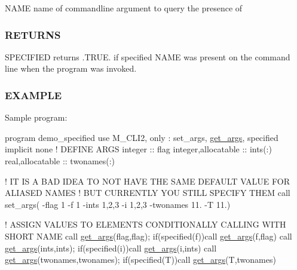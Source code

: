 \begin{DoxyVerb}NAME   name of commandline argument to query the presence of
\end{DoxyVerb}


\subsubsection*{R\+E\+T\+U\+R\+NS}

S\+P\+E\+C\+I\+F\+I\+ED returns .T\+R\+UE. if specified N\+A\+ME was present on the command line when the program was invoked.

\subsubsection*{E\+X\+A\+M\+P\+LE}

Sample program\+:

program demo\+\_\+specified use M\+\_\+\+C\+L\+I2, only \+: set\+\_\+args, \mbox{\hyperlink{interfacem__cli2_1_1get__args}{get\+\_\+args}}, specified implicit none ! D\+E\+F\+I\+NE A\+R\+GS integer \+:\+: flag integer,allocatable \+:\+: ints(\+:) real,allocatable \+:\+: twonames(\+:)

! IT IS A B\+AD I\+D\+EA TO N\+OT H\+A\+VE T\+HE S\+A\+ME D\+E\+F\+A\+U\+LT V\+A\+L\+UE F\+OR A\+L\+I\+A\+S\+ED N\+A\+M\+ES ! B\+UT C\+U\+R\+R\+E\+N\+T\+LY Y\+OU S\+T\+I\+LL S\+P\+E\+C\+I\+FY T\+H\+EM call set\+\_\+args(\textquotesingle{} -\/flag 1 -\/f 1 -\/ints 1,2,3 -\/i 1,2,3 -\/twonames 11. -\/T 11.\textquotesingle{})

! A\+S\+S\+I\+GN V\+A\+L\+U\+ES TO E\+L\+E\+M\+E\+N\+TS C\+O\+N\+D\+I\+T\+I\+O\+N\+A\+L\+LY C\+A\+L\+L\+I\+NG W\+I\+TH S\+H\+O\+RT N\+A\+ME call \mbox{\hyperlink{interfacem__cli2_1_1get__args}{get\+\_\+args}}(\textquotesingle{}flag\textquotesingle{},flag); if(specified(\textquotesingle{}f\textquotesingle{}))call \mbox{\hyperlink{interfacem__cli2_1_1get__args}{get\+\_\+args}}(\textquotesingle{}f\textquotesingle{},flag) call \mbox{\hyperlink{interfacem__cli2_1_1get__args}{get\+\_\+args}}(\textquotesingle{}ints\textquotesingle{},ints); if(specified(\textquotesingle{}i\textquotesingle{}))call \mbox{\hyperlink{interfacem__cli2_1_1get__args}{get\+\_\+args}}(\textquotesingle{}i\textquotesingle{},ints) call \mbox{\hyperlink{interfacem__cli2_1_1get__args}{get\+\_\+args}}(\textquotesingle{}twonames\textquotesingle{},twonames); if(specified(\textquotesingle{}T\textquotesingle{}))call \mbox{\hyperlink{interfacem__cli2_1_1get__args}{get\+\_\+args}}(\textquotesingle{}T\textquotesingle{},twonames)

